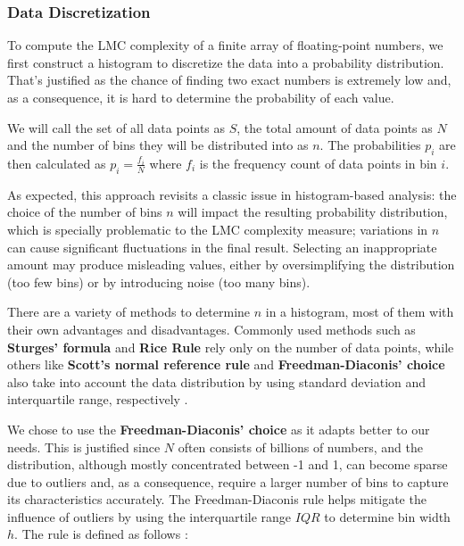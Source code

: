     \subsubsection{Data Discretization}

        To compute the LMC complexity of a finite array of floating-point numbers, we first construct a histogram to discretize the data into a probability distribution. That's justified as the chance of finding two exact numbers is extremely low and, as a consequence, it is hard to determine the probability of each value. 
        
        We will call the set of all data points as \( S \), the total amount of data points as \( N \) and the number of bins they will be distributed into as \( n \). The probabilities \( p_i \) are then calculated as \( p_i = \frac{f_i}{N} \) where \( f_i \) is the frequency count of data points in bin \( i \).

        As expected, this approach revisits a classic issue in histogram-based analysis: the choice of the number of bins \( n \) will impact the resulting probability distribution, which is specially problematic to the LMC complexity measure; variations in \( n \) can cause significant fluctuations in the final result. Selecting an inappropriate amount may produce misleading values, either by oversimplifying the distribution (too few bins) or by introducing noise (too many bins). 

        There are a variety of methods to determine \( n \) in a histogram, most of them with their own advantages and disadvantages. Commonly used methods such as \textbf{Sturges' formula} \cite{Sturges1926} and \textbf{Rice Rule} \cite{RiceRule} rely only on the number of data points, while others like \textbf{Scott's normal reference rule} and \textbf{Freedman-Diaconis' choice} also take into account the data distribution by using standard deviation and interquartile range, respectively \cite{Knuth2006}.   

        We chose to use the \textbf{Freedman-Diaconis' choice} as it adapts better to our needs. This is justified since \( N \) often consists of billions of numbers, and the distribution, although mostly concentrated between -1 and 1, can become sparse due to outliers and, as a consequence, require a larger number of bins to capture its characteristics accurately. The Freedman-Diaconis rule helps mitigate the influence of outliers by using the interquartile range \( IQR \) to determine bin width \( h \). The rule is defined as follows \cite{FreedmanDiaconis1981}:

